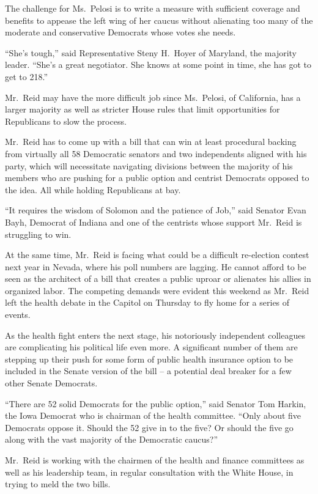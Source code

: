 ﻿\documentclass[12pt]{article}
\begin{document}
The challenge for Ms.~Pelosi is to write a measure with sufficient coverage and benefits to appease
the left wing of her caucus without alienating\cite{alienate} too many of the moderate and
conservative Democrats whose votes she needs.

``She's tough,'' said Representative Steny H.~Hoyer of Maryland, the majority leader. ``She's a
great negotiator. She knows at some point in time, she has got to get to 218.''

Mr.~Reid may have the more difficult job since Ms.~Pelosi, of California, has a larger majority as
well as stricter House rules that limit opportunities for Republicans to slow the process.

Mr.~Reid has to come up with a bill that can win at least procedural backing from virtually all 58
Democratic senators and two independents aligned with his party, which will necessitate navigating
divisions between the majority of his members who are pushing for a public option and centrist
Democrats opposed to the idea. All while holding Republicans at bay.

``It requires the wisdom of Solomon and the patience of Job,'' said Senator Evan Bayh, Democrat of
Indiana and one of the centrists whose support Mr.~Reid is struggling to win.

At the same time, Mr.~Reid is facing what could be a difficult re-election contest next year in
Nevada, where his poll numbers are lagging\cite{lag}. He cannot afford to be seen as the architect
of a bill that creates a public uproar or alienates his allies in organized labor. The competing
demands were evident this weekend as Mr.~Reid left the health debate in the Capitol on Thursday to
fly home for a series of events.

As the health fight enters the next stage, his notoriously\cite{notoriously} independent colleagues
are complicating his political life even more. A significant number of them are stepping up their
push for some form of public health insurance option to be included in the Senate version of the
bill -- a potential deal breaker for a few other Senate Democrats.

``There are 52 solid Democrats for the public option,'' said Senator Tom Harkin, the Iowa Democrat
who is chairman of the health committee. ``Only about five Democrats oppose it. Should the 52 give
in to the five? Or should the five go along with the vast majority of the Democratic caucus?''

Mr.~Reid is working with the chairmen of the health and finance committees as well as his leadership
team, in regular consultation with the White House, in trying to meld the two bills.
\end{document}

